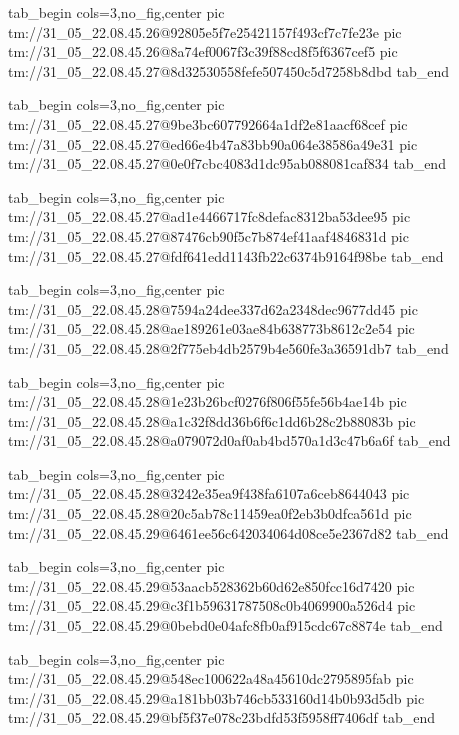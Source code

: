  
 
 
 
 

\qqSecCmtScr


\ifcmt
  tab_begin cols=3,no_fig,center
    pic tm://31_05_22.08.45.26@92805e5f7e25421157f493cf7c7fe23e
    pic tm://31_05_22.08.45.26@8a74ef0067f3c39f88cd8f5f6367cef5
    pic tm://31_05_22.08.45.27@8d32530558fefe507450c5d7258b8dbd
  tab_end
\fi


\ifcmt
  tab_begin cols=3,no_fig,center
    pic tm://31_05_22.08.45.27@9be3bc607792664a1df2e81aacf68cef
    pic tm://31_05_22.08.45.27@ed66e4b47a83bb90a064e38586a49e31
    pic tm://31_05_22.08.45.27@0e0f7cbc4083d1dc95ab088081caf834
  tab_end
\fi


\ifcmt
  tab_begin cols=3,no_fig,center
    pic tm://31_05_22.08.45.27@ad1e4466717fc8defac8312ba53dee95
    pic tm://31_05_22.08.45.27@87476cb90f5c7b874ef41aaf4846831d
    pic tm://31_05_22.08.45.27@fdf641edd1143fb22c6374b9164f98be
  tab_end
\fi


\ifcmt
  tab_begin cols=3,no_fig,center
    pic tm://31_05_22.08.45.28@7594a24dee337d62a2348dec9677dd45
    pic tm://31_05_22.08.45.28@ae189261e03ae84b638773b8612c2e54
    pic tm://31_05_22.08.45.28@2f775eb4db2579b4e560fe3a36591db7
  tab_end
\fi


\ifcmt
  tab_begin cols=3,no_fig,center
    pic tm://31_05_22.08.45.28@1e23b26bcf0276f806f55fe56b4ae14b
    pic tm://31_05_22.08.45.28@a1c32f8dd36b6f6c1dd6b28c2b88083b
    pic tm://31_05_22.08.45.28@a079072d0af0ab4bd570a1d3c47b6a6f
  tab_end
\fi


\ifcmt
  tab_begin cols=3,no_fig,center
    pic tm://31_05_22.08.45.28@3242e35ea9f438fa6107a6ceb8644043
    pic tm://31_05_22.08.45.28@20c5ab78c11459ea0f2eb3b0dfca561d
    pic tm://31_05_22.08.45.29@6461ee56c642034064d08ce5e2367d82
  tab_end
\fi


\ifcmt
  tab_begin cols=3,no_fig,center
    pic tm://31_05_22.08.45.29@53aacb528362b60d62e850fcc16d7420
    pic tm://31_05_22.08.45.29@c3f1b59631787508c0b4069900a526d4
    pic tm://31_05_22.08.45.29@0bebd0e04afc8fb0af915cdc67c8874e
  tab_end
\fi


\ifcmt
  tab_begin cols=3,no_fig,center
    pic tm://31_05_22.08.45.29@548ec100622a48a45610dc2795895fab
    pic tm://31_05_22.08.45.29@a181bb03b746cb533160d14b0b93d5db
    pic tm://31_05_22.08.45.29@bf5f37e078c23bdfd53f5958ff7406df
  tab_end
\fi


